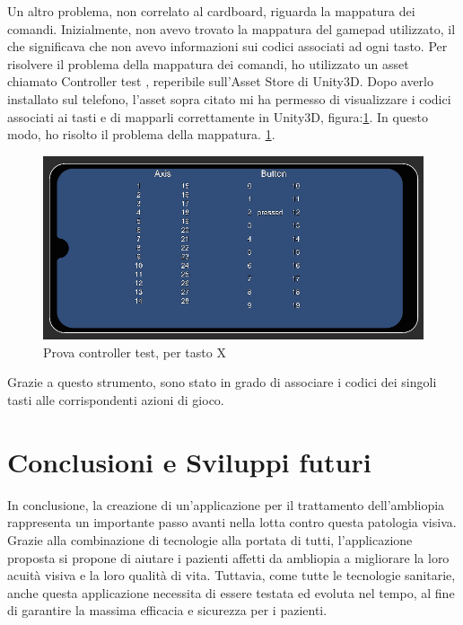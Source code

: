\documentclass[
a4paper,
cleardoublepage=empty,
headings=twolinechapter,
numbers=autoenddot,
]{scrbook}
\begin{document}
   Un altro problema, non correlato al cardboard, riguarda la mappatura dei comandi. Inizialmente, non avevo trovato la mappatura del gamepad utilizzato, il che significava che non avevo informazioni sui codici associati ad ogni tasto. Per risolvere il problema della mappatura dei comandi, ho utilizzato un asset chiamato Controller test \cite{Controller_test}, reperibile sull'Asset Store di Unity3D. Dopo averlo installato sul telefono, l'asset sopra citato mi ha permesso di visualizzare i codici associati ai tasti e di mapparli correttamente in Unity3D, figura:\ref{fig:controller_test}. In questo modo, ho risolto il problema della mappatura. \ref{fig:controller_test}.
	\begin{figure}[H]
		\centering
		\includegraphics[width=0.7\linewidth]{image/controller_test}
		\caption{Prova controller test, per tasto X}
		\label{fig:controller_test}
	\end{figure}
	Grazie a questo strumento, sono stato in grado di associare i codici dei singoli tasti alle corrispondenti azioni di gioco.
	\chapter{Conclusioni e Sviluppi futuri}
	In conclusione, la creazione di un'applicazione per il trattamento dell'ambliopia rappresenta un importante passo avanti nella lotta contro questa patologia visiva. Grazie alla combinazione di tecnologie alla portata di tutti, l'applicazione proposta si propone di aiutare i pazienti affetti da ambliopia a migliorare la loro acuità visiva e la loro qualità di vita. Tuttavia, come tutte le tecnologie sanitarie, anche questa applicazione necessita di essere testata ed evoluta nel tempo, al fine di garantire la massima efficacia e sicurezza per i pazienti.\\\\
	
\end{document}

